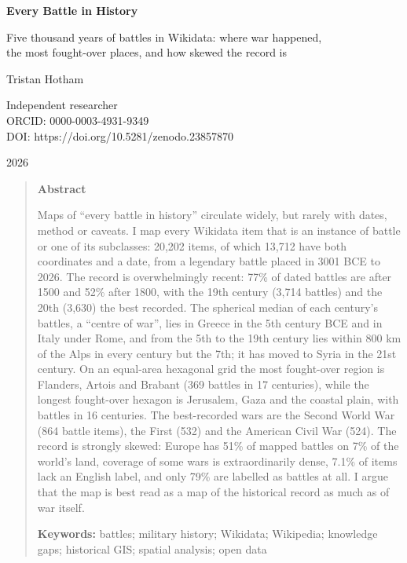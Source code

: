 \documentclass[11pt,a4paper]{article}
\begin{document}
\begin{center}
{\Large\bfseries Every Battle in History\par}
\vspace{0.4em}
{\large Five thousand years of battles in Wikidata: where war happened,\\the most fought-over places, and how skewed the record is\par}
\vspace{1.2em}
{\large Tristan Hotham\par}
\vspace{0.3em}
{\small Independent researcher\\
ORCID: 0000-0003-4931-9349\\
DOI: https://doi.org/10.5281/zenodo.23857870\par}
\vspace{0.8em}
2026
\end{center}

\begin{quote}
\small
\begin{center}\textbf{Abstract}\end{center}
Maps of ``every battle in history'' circulate widely, but rarely with dates, method or caveats. I map every Wikidata item that is an instance of battle or one of its subclasses: 20,202 items, of which 13,712 have both coordinates and a date, from a legendary battle placed in 3001 BCE to 2026. The record is overwhelmingly recent: 77\% of dated battles are after 1500 and 52\% after 1800, with the 19th century (3,714 battles) and the 20th (3,630) the best recorded. The spherical median of each century's battles, a ``centre of war'', lies in Greece in the 5th century BCE and in Italy under Rome, and from the 5th to the 19th century lies within 800 km of the Alps in every century but the 7th; it has moved to Syria in the 21st century. On an equal-area hexagonal grid the most fought-over region is Flanders, Artois and Brabant (369 battles in 17 centuries), while the longest fought-over hexagon is Jerusalem, Gaza and the coastal plain, with battles in 16 centuries. The best-recorded wars are the Second World War (864 battle items), the First (532) and the American Civil War (524). The record is strongly skewed: Europe has 51\% of mapped battles on 7\% of the world's land, coverage of some wars is extraordinarily dense, 7.1\% of items lack an English label, and only 79\% are labelled as battles at all. I argue that the map is best read as a map of the historical record as much as of war itself.

\textbf{Keywords:} battles; military history; Wikidata; Wikipedia; knowledge gaps; historical GIS; spatial analysis; open data
\end{quote}
\end{document}
